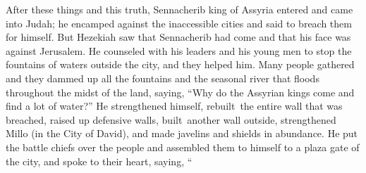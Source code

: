 
\begin{inparaenum}
     After these things and this truth, Sennacherib king of Assyria entered and came into Judah; he encamped against the inaccessible cities and said to breach them for himself.%
     But Hezekiah saw that Sennacherib had come and that his face was against Jerusalem.%
     He counseled with his leaders and his young men to stop the fountains of waters outside the city, and they helped him.%
     Many people gathered and they dammed up all the fountains and the seasonal river that floods throughout the midst of the land, saying, ``Why do the Assyrian kings come and find a lot of water?''%
     He strengthened himself, rebuilt\thinspace\understood\ the entire wall that was breached, raised up defensive walls, built\understood\ another wall outside, strengthened Millo (in the City of David), and made javelins and shields in abundance.%
     He put the battle chiefs over the people and assembled them to himself to a plaza gate of the city, and spoke to their heart, saying,%
     ``%
    
    
    
    
\end{inparaenum}
